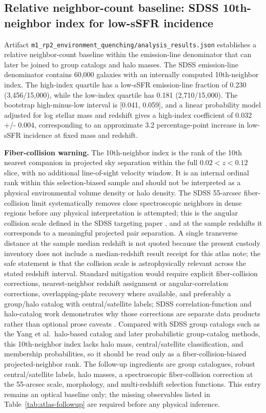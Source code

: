 \documentclass[twocolumn]{aastex631}
\begin{document}
\subsection{Relative neighbor-count baseline: SDSS 10th-neighbor index for low-sSFR incidence}
Artifact \texttt{m1\_rp2\_environment\_quenching/analysis\_results.json} establishes a relative neighbor-count baseline within the emission-line denominator that can later be joined to group catalogs and halo masses. The SDSS emission-line denominator contains 60,000 galaxies with an internally computed 10th-neighbor index. The high-index quartile has a low-sSFR emission-line fraction of 0.230 (3,456/15,000), while the low-index quartile has 0.181 (2,710/15,000). The bootstrap high-minus-low interval is [0.041, 0.059], and a linear probability model adjusted for log stellar mass and redshift gives a high-index coefficient of 0.032 +/- 0.004, corresponding to an approximate 3.2 percentage-point increase in low-sSFR incidence at fixed mass and redshift.
\par\noindent\textbf{Fiber-collision warning.} The 10th-neighbor index is the rank of the 10th nearest companion in projected sky separation within the full $0.02<z<0.12$ slice, with no additional line-of-sight velocity window. It is an internal ordinal rank within this selection-biased sample and should not be interpreted as a physical environmental volume density or halo density. The SDSS 55-arcsec fiber-collision limit systematically removes close spectroscopic neighbors in dense regions before any physical interpretation is attempted; this is the angular collision scale defined in the SDSS targeting paper \citep{strauss2002}, and at the sample redshifts it corresponds to a meaningful projected pair separation. A single transverse distance at the sample median redshift is not quoted because the present custody inventory does not include a median-redshift result receipt for this atlas note; the safe statement is that the collision scale is astrophysically relevant across the stated redshift interval. Standard mitigation would require explicit fiber-collision corrections, nearest-neighbor redshift assignment or angular-correlation corrections, overlapping-plate recovery where available, and preferably a group/halo catalog with central/satellite labels; SDSS correlation-function and halo-catalog work demonstrates why those corrections are separate data products rather than optional prose caveats \citep{zehavi2002,zehavi2011,blanton2003,guo2012,yang2007,tinker2021}. Compared with SDSS group catalogs such as the Yang et al.\ halo-based catalog and later probabilistic group-catalog methods, this 10th-neighbor index lacks halo mass, central/satellite classification, and membership probabilities, so it should be read only as a fiber-collision-biased projected-neighbor rank. The follow-up ingredients are group catalogues, robust central/satellite labels, halo masses, a spectroscopic fiber-collision correction at the 55-arcsec scale, morphology, and multi-redshift selection functions. This entry remains an optical baseline only; the missing observables listed in Table~\ref{tab:atlas-followup} are required before any physical inference.
\end{document}
